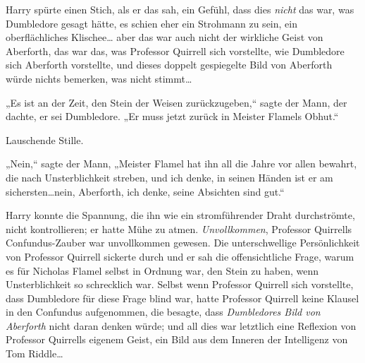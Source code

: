 Harry spürte einen Stich, als er das sah, ein Gefühl, dass dies \emph{nicht} das war, was Dumbledore gesagt hätte, es schien eher ein Strohmann zu sein, ein oberflächliches Klischee… aber das war auch nicht der wirkliche Geist von Aberforth, das war das, was Professor Quirrell sich vorstellte, wie Dumbledore sich Aberforth vorstellte, und dieses doppelt gespiegelte Bild von Aberforth würde nichts bemerken, was nicht stimmt…

„Es ist an der Zeit, den Stein der Weisen zurückzugeben,“ sagte der Mann, der dachte, er sei Dumbledore. „Er muss jetzt zurück in Meister Flamels Obhut.“

Lauschende Stille.

„Nein,“ sagte der Mann, „Meister Flamel hat ihn all die Jahre vor allen bewahrt, die nach Unsterblichkeit streben, und ich denke, in seinen Händen ist er am sichersten…nein, Aberforth, ich denke, seine Absichten sind gut.“

Harry konnte die Spannung, die ihn wie ein stromführender Draht durchströmte, nicht kontrollieren; er hatte Mühe zu atmen. \emph{Unvollkommen}, Professor Quirrells Confundus-Zauber war unvollkommen gewesen. Die unterschwellige Persönlichkeit von Professor Quirrell sickerte durch und er sah die offensichtliche Frage, warum es für Nicholas Flamel selbst in Ordnung war, den Stein zu haben, wenn Unsterblichkeit so schrecklich war. Selbst wenn Professor Quirrell sich vorstellte, dass Dumbledore für diese Frage blind war, hatte Professor Quirrell keine Klausel in den Confundus aufgenommen, die besagte, dass \emph{Dumbledores Bild von Aberforth} nicht daran denken würde; und all dies war letztlich eine Reflexion von Professor Quirrells eigenem Geist, ein Bild aus dem Inneren der Intelligenz von Tom Riddle…

